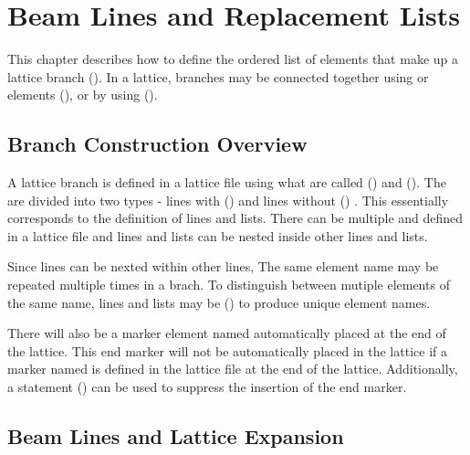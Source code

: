 \chapter{Beam Lines and Replacement Lists}
\label{c:sequence}

This chapter describes how to define the ordered list of elements that
make up a lattice branch ().  In a lattice,
branches may be connected together using  or  elements (), or by using  ().

\section{Branch Construction Overview}
\label{s:branch.construct}

A lattice branch is defined in a lattice file using what are called
 () and 
().  The  are divided into two
types - lines with () and lines without
() . This essentially
corresponds to the \mad definition of lines and lists. There can be
multiple  and  defined in a
lattice file and lines and lists can be nested inside other lines and
lists.

Since lines can be nexted within other lines, The same element name
may be repeated multiple times in a brach. To distinguish between
mutiple elements of the same name, lines and lists may be  
() to produce unique element names.

There will also be a marker element named  automatically
placed at the end of the lattice. This end marker will not be
automatically placed in the lattice if a marker named  is
defined in the lattice file at the end of the lattice. Additionally, a
 statement () can be used
to suppress the insertion of the end marker.

\section{Beam Lines and Lattice Expansion}
\label{s:lines.wo.arg}

